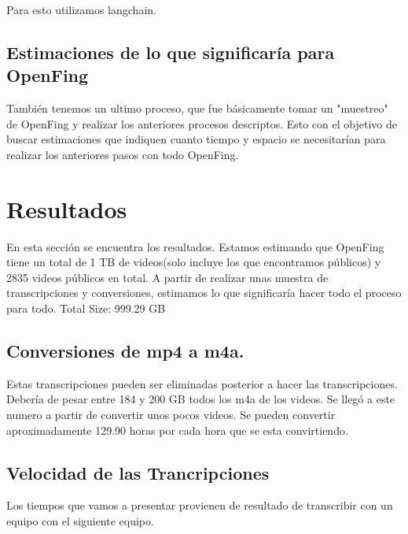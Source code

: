 Para esto utilizamos langchain.

\subsection[Estimaciones de lo que significaría para OpenFing]{Estimaciones de lo que significaría para OpenFing}
\label{Estimaciones de lo que significaría para OpenFing}
También tenemos un ultimo proceso, que fue básicamente tomar un "muestreo" de OpenFing y realizar los anteriores procesos descriptos. Esto con el objetivo de buscar estimaciones que indiquen cuanto tiempo y espacio se necesitarían para realizar los anteriores pasos con todo OpenFing.

\section{Resultados}
\label{section:Resultados}
\label{Resultados}
En esta sección se encuentra los resultados. 
Estamos estimando que OpenFing tiene un total de 1 TB de videos(solo incluye los que encontramos públicos) y 2835 videos públicos en total. A partir de realizar unas muestra de transcripciones y conversiones, estimamos lo que significaría hacer todo el proceso para todo. 
Total Size: 999.29 GB 
\subsection{Conversiones de mp4 a m4a.}
\label{subsection:Conversiones de mp4 a m4a.}
\label{Conversiones de mp4 a m4a.}
Estas transcripciones pueden ser eliminadas posterior a hacer las transcripciones.
Debería de pesar entre 184 y 200 GB todos los m4a de los videos. Se llegó a este numero a partir de convertir unos pocos videos. 
Se pueden convertir aproximadamente 129.90 horas por cada hora que se esta convirtiendo. 
\subsection{Velocidad de las Trancripciones}
\label{subsection:Velocidad de las Trancripciones}
\label{Velocidad de las Trancripciones}
Los tiempos que vamos a presentar provienen de resultado de transcribir con un equipo con el siguiente equipo.

